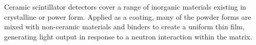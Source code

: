 \documentclass[../../../../main.tex]{subfiles}%
\begin{document}
%
    \Xsubsubsection%
    Ceramic scintillator detectors cover a range of inorganic materials existing in crystalline or power form.
    Applied as a coating, many of the powder forms are mixed with non-ceramic materials and binders to create a uniform thin film, generating light output in response to a neutron interaction within the matrix.
\end{document}
